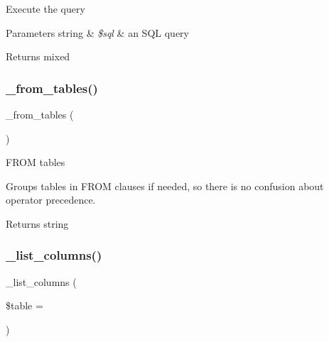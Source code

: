 Execute the query


\begin{DoxyParams}[1]{Parameters}
string & {\em \$sql} & an S\+QL query \\
\hline
\end{DoxyParams}
\begin{DoxyReturn}{Returns}
mixed 
\end{DoxyReturn}
\mbox{\label{class_c_i___d_b__mysqli__driver_aef43f7e3e7b71d337ff3724c5eb14f10}} 
\subsubsection{\texorpdfstring{\+\_\+from\+\_\+tables()}{\_from\_tables()}}
{\footnotesize\ttfamily \+\_\+from\+\_\+tables (\begin{DoxyParamCaption}{ }\end{DoxyParamCaption})\hspace{0.3cm}{\ttfamily [protected]}}

F\+R\+OM tables

Groups tables in F\+R\+OM clauses if needed, so there is no confusion about operator precedence.

\begin{DoxyReturn}{Returns}
string 
\end{DoxyReturn}
\mbox{\label{class_c_i___d_b__mysqli__driver_a7ccb7f9c301fe7f0a9db701254142b63}} 
\subsubsection{\texorpdfstring{\+\_\+list\+\_\+columns()}{\_list\_columns()}}
{\footnotesize\ttfamily \+\_\+list\+\_\+columns (\begin{DoxyParamCaption}\item[{}]{\$table = {\ttfamily \textquotesingle{}\textquotesingle{}} }\end{DoxyParamCaption})\hspace{0.3cm}{\ttfamily [protected]}}


